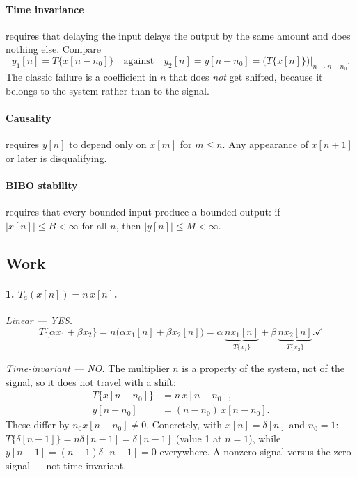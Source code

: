 \paragraph{Time invariance} requires that delaying the input delays the output by
the same amount and does nothing else. Compare
\begin{equation}
  y_1[n] = T\{x[n-n_0]\}
  \quad\text{against}\quad
  y_2[n] = y[n-n_0] = \big(T\{x[n]\}\big)\big|_{n \to n-n_0}.
  \label{eq:ti}
\end{equation}
The classic failure is a coefficient in $n$ that does \emph{not} get shifted,
because it belongs to the system rather than to the signal.

\paragraph{Causality} requires $y[n]$ to depend only on $x[m]$ for $m \le n$.
Any appearance of $x[n+1]$ or later is disqualifying.

\paragraph{BIBO stability} requires that every bounded input produce a bounded
output: if $|x[n]| \le B < \infty$ for all $n$, then $|y[n]| \le M < \infty$.

\subsection*{Work}

\paragraph{1. $T_a(x[n]) = n\,x[n]$.}

\emph{Linear — YES.}
\begin{equation}
  T\{\alpha x_1 + \beta x_2\} = n\big(\alpha x_1[n] + \beta x_2[n]\big)
    = \alpha\,\underbrace{n x_1[n]}_{T\{x_1\}} + \beta\,\underbrace{n x_2[n]}_{T\{x_2\}}. \checkmark
\end{equation}

\emph{Time-invariant — NO.} The multiplier $n$ is a property of the system, not
of the signal, so it does not travel with a shift:
\begin{align}
  T\{x[n-n_0]\} &= n\,x[n-n_0], \\
  y[n-n_0]      &= (n-n_0)\,x[n-n_0].
\end{align}
These differ by $n_0 x[n-n_0] \ne 0$. Concretely, with $x[n] = \delta[n]$ and
$n_0 = 1$: $T\{\delta[n-1]\} = n\delta[n-1] = \delta[n-1]$ (value 1 at $n=1$),
while $y[n-1] = (n-1)\delta[n-1] = 0$ everywhere. A nonzero signal versus the
zero signal — not time-invariant.

